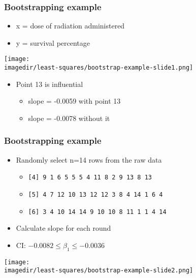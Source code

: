 \begin{frame}\frametitle{Bootstrapping example}
	\begin{itemize}
		\item	x = dose of radiation administered
		\item	y = survival percentage
	\end{itemize}
	\begin{center}
		\texttt{[image: \\imagedir/least-squares/bootstrap-example-slide1.png]}
	\end{center}
	\begin{itemize}
		\item	Point 13 is influential
		\begin{itemize}
			\item	slope = -0.0059 with point 13
			\item	slope = -0.0078 without it
		\end{itemize}
	\end{itemize}
\end{frame}

\begin{frame}\frametitle{Bootstrapping example}
	\begin{itemize}
		\item	Randomly select n=14 rows from the raw data
		\begin{itemize}
			\item	\texttt{[4] 9 1 6 5 5 5 4 11 8 2 9 13 8 13}
			\item	\texttt{[5] 4 7 12 10 13 12 12 3 8 4 14 1 6 4}
			\item	\texttt{[6] 3 4 10 14 14 9 10 10 8 11 1 1 4 14}
		\end{itemize}
		\item	Calculate slope for each round
		\item	CI: $-0.0082 \leq \beta_1 \leq -0.0036$
	\end{itemize}
	\begin{center}
		\texttt{[image: \\imagedir/least-squares/bootstrap-example-slide2.png]}
	\end{center}
\end{frame}

